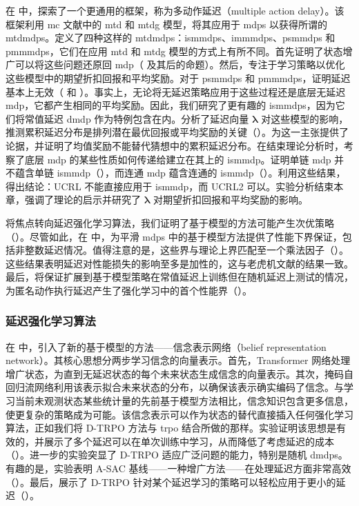 在  中，探索了一个更通用的框架，称为多动作延迟（multiple action delay）。该框架利用 \gls{mc} 文献中的 \gls{mtd} 和 \gls{mtdg} 模型，将其应用于 \glspl{mdp} 以获得所谓的 \glspl{mtdmdp}。定义了四种这样的 \glspl{mtdmdp}：\glspl{ismmdp}、\glspl{immmdp}、\glspl{psmmdp} 和 \glspl{pmmmdp}，它们在应用 \gls{mtd} 和 \gls{mtdg} 模型的方式上有所不同。首先证明了状态增广可以将这些问题还原回 \gls{mdp}（ 及其后的命题）。然后，专注于学习策略以优化这些模型中的期望折扣回报和平均奖励。对于 \glspl{psmmdp} 和 \glspl{pmmmdp}，证明延迟基本上无效（ 和 ）。事实上，无论将无延迟策略应用于这些过程还是底层无延迟 \gls{mdp}，它都产生相同的平均奖励。因此，我们研究了更有趣的 \glspl{ismmdp}，因为它们将常值延迟 \gls{dmdp} 作为特例包含在内。分析了延迟向量 $\boldsymbol\lambda$ 对这些模型的影响，推测累积延迟分布是排列潜在最优回报或平均奖励的关键（）。为这一主张提供了论据，并证明了均值奖励不能替代猜想中的累积延迟分布。在结束理论分析时，考察了底层 \gls{mdp} 的某些性质如何传递给建立在其上的 \gls{ismmdp}。证明单链 \gls{mdp} 并不蕴含单链 \gls{ismmdp}（），而连通 \gls{mdp} 蕴含连通的 \gls{ismmdp}（）。利用这些结果，得出结论：UCRL 不能直接应用于 \gls{ismmdp}，而 UCRL2 可以。实验分析结束本章，强调了理论的启示并研究了 $\boldsymbol\lambda$ 对期望折扣回报和平均奖励的影响。

将焦点转向延迟强化学习算法，我们证明了基于模型的方法可能产生次优策略（）。尽管如此，在  中，为平滑 \glspl{mdp} 中的基于模型方法提供了性能下界保证，包括非整数延迟情况。值得注意的是，这些界与理论上界匹配至一个乘法因子（）。这些结果表明延迟对性能损失的影响至多是加性的，这与老虎机文献的结果一致。最后，将保证扩展到基于模型策略在常值延迟上训练但在随机延迟上测试的情况，为匿名动作执行延迟产生了强化学习中的首个性能界（）。


\subsubsection{延迟强化学习算法}
在  中，引入了新的基于模型的方法——信念表示网络（belief representation network）。其核心思想分两步学习信念的向量表示。首先，Transformer 网络处理增广状态，为直到无延迟状态的每个未来状态生成信念的向量表示。其次，掩码自回归流网络利用该表示拟合未来状态的分布，以确保该表示确实编码了信念。与学习当前未观测状态某些统计量的先前基于模型方法相比，信念知识包含更多信息，使更复杂的策略成为可能。该信念表示可以作为状态的替代直接插入任何强化学习算法，正如我们将 D-TRPO 方法与 \gls{trpo} 结合所做的那样。实验证明该思想是有效的，并展示了多个延迟可以在单次训练中学习，从而降低了考虑延迟的成本（）。进一步的实验突显了 D-TRPO 适应广泛问题的能力，特别是随机 \glspl{dmdp}。有趣的是，实验表明 A-SAC 基线——一种增广方法——在处理延迟方面非常高效（）。最后，展示了 D-TRPO 针对某个延迟学习的策略可以轻松应用于更小的延迟（）。

